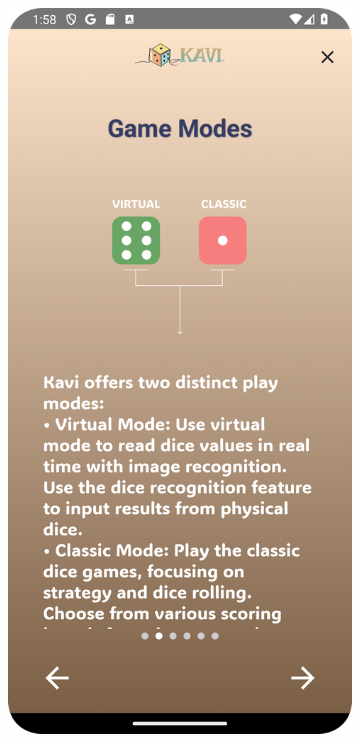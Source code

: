 \begin{figure}[ht!]
    \centering
    \begin{subfigure}[b]{0.27\textwidth}
        \centering
        \includegraphics[width=\textwidth]{img/instructions screen.png}

\end{subfigure}
\end{figure}
